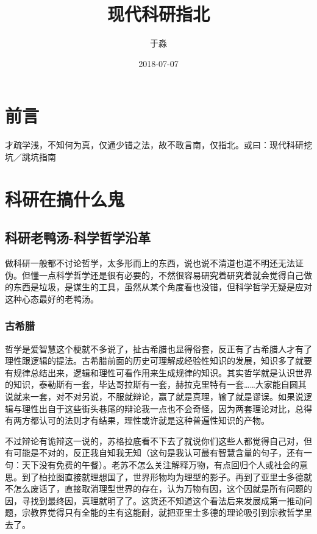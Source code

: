 \documentclass[]{book}
\title{现代科研指北}
\author{于淼}
\date{2018-07-07}
\begin{document}
\maketitle

{
\setcounter{tocdepth}{1}
\tableofcontents
}
\chapter{前言}

才疏学浅，不知何为真，仅通少错之法，故不敢言南，仅指北。或曰：现代科研挖坑／跳坑指南

\chapter{科研在搞什么鬼}\label{intro}

\section{科研老鸭汤-科学哲学沿革}\label{-}

做科研一般都不讨论哲学，太多形而上的东西，说也说不清道也道不明还无法证伪。但懂一点科学哲学还是很有必要的，不然很容易研究着研究着就会觉得自己做的东西是垃圾，是谋生的工具，虽然从某个角度看也没错，但科学哲学无疑是应对这种心态最好的老鸭汤。

\subsection{古希腊}

哲学是爱智慧这个梗就不多说了，扯古希腊也显得俗套，反正有了古希腊人才有了理性跟逻辑的提法。古希腊前面的历史可理解成经验性知识的发展，知识多了就要有规律总结出来，逻辑和理性可看作用来生成规律的知识。其实哲学就是认识世界的知识，泰勒斯有一套，毕达哥拉斯有一套，赫拉克里特有一套\ldots{}\ldots{}大家能自圆其说就来一套，对不对另说，不服就辩论，赢了就是真理，输了就是谬误。如果说逻辑与理性出自于这些街头巷尾的辩论我一点也不会奇怪，因为两套理论对比，总得有两方都认可的法则才有结果，理性或许就是这种普遍性知识的产物。

不过辩论有诡辩这一说的，苏格拉底看不下去了就说你们这些人都觉得自己对，但有可能是不对的，反正我自知我无知（这句是我认可最有智慧含量的句子，还有一句：天下没有免费的午餐）。老苏不怎么关注解释万物，有点回归个人或社会的意思。到了柏拉图直接就理想国了，世界形物均为理型的影子。再到了亚里士多德就不怎么废话了，直接取消理型世界的存在，认为万物有因，这个因就是所有问题的因，寻找到最终因，真理就明了了。这货还不知道这个看法后来发展成第一推动问题，宗教界觉得只有全能的主有这能耐，就把亚里士多德的理论吸引到宗教哲学里去了。
\end{document}
